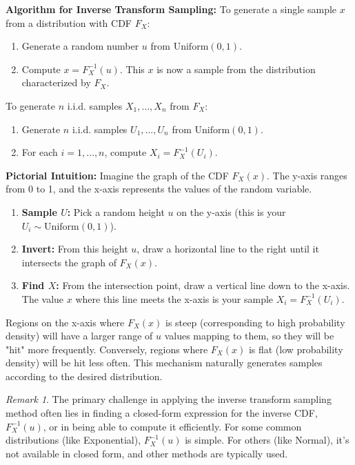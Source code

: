 \documentclass[11pt, letterpaper]{article}
\theoremstyle{plain} %
\theoremstyle{definition} %
\theoremstyle{remark} %
\newtheorem{remark}[theorem]{Remark}
\newcommand{\Unif}{\mathrm{Uniform}}
\begin{document}
\textbf{Algorithm for Inverse Transform Sampling:}
To generate a single sample $x$ from a distribution with CDF $F_X$:
\begin{enumerate}
    \item Generate a random number $u$ from $\Unif(0,1)$.
    \item Compute $x = F_X^{-1}(u)$. This $x$ is now a sample from the distribution characterized by $F_X$.
\end{enumerate}
To generate $n$ i.i.d. samples $X_1, \dots, X_n$ from $F_X$:
\begin{enumerate}
    \item Generate $n$ i.i.d. samples $U_1, \dots, U_n$ from $\Unif(0,1)$.
    \item For each $i=1, \dots, n$, compute $X_i = F_X^{-1}(U_i)$.
\end{enumerate}

\textbf{Pictorial Intuition:}
Imagine the graph of the CDF $F_X(x)$. The y-axis ranges from 0 to 1, and the x-axis represents the values of the random variable.
\begin{enumerate}
    \item \textbf{Sample $U$:} Pick a random height $u$ on the y-axis (this is your $U_i \sim \Unif(0,1)$).
    \item \textbf{Invert:} From this height $u$, draw a horizontal line to the right until it intersects the graph of $F_X(x)$.
    \item \textbf{Find $X$:} From the intersection point, draw a vertical line down to the x-axis. The value $x$ where this line meets the x-axis is your sample $X_i = F_X^{-1}(U_i)$.
\end{enumerate}
Regions on the x-axis where $F_X(x)$ is steep (corresponding to high probability density) will have a larger range of $u$ values mapping to them, so they will be "hit" more frequently. Conversely, regions where $F_X(x)$ is flat (low probability density) will be hit less often. This mechanism naturally generates samples according to the desired distribution.

\begin{center}
    \end{center}
    \begin{remark}
    The primary challenge in applying the inverse transform sampling method often lies in finding a closed-form expression for the inverse CDF, $F_X^{-1}(u)$, or in being able to compute it efficiently. For some common distributions (like Exponential), $F_X^{-1}(u)$ is simple. For others (like Normal), it's not available in closed form, and other methods are typically used.
\end{remark}
\end{document}
